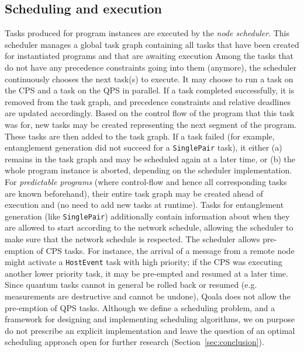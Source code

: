 \subsection{Scheduling and execution}
\label{sec:scheduling}
Tasks produced for program instances are executed by the \textit{node scheduler}.
This scheduler manages a global task graph containing all tasks that have been created for instantiated programs and that are awaiting execution
Among the tasks that do not have any precedence constraints going into them (anymore), the scheduler continuously chooses the next task(s) to execute.
It may choose to run a task on the CPS and a task on the QPS in parallel.
If a task completed successfully, it is removed from the task graph, and precedence constraints and relative deadlines are updated accordingly.
Based on the control flow of the program that this task was for, new tasks may be created representing the next segment of the program.
These tasks are then added to the task graph.
If a task failed (for example, entanglement generation did not succeed for a \texttt{SinglePair} task), it either (a) remains in the task graph and may be scheduled again at a later time,
or (b) the whole program instance is aborted, depending on the scheduler implementation.
For \textit{predictable programs} (where control-flow and hence all corresponding tasks are known beforehand), their entire task graph may be created ahead of execution
and (no need to add new tasks at runtime).
Tasks for entanglement generation (like \texttt{SinglePair}) additionally contain information about when they are allowed to start according to the network schedule,
allowing the scheduler to make sure that the network schedule is respected.
The scheduler allows pre-emption of CPS tasks.
For instance, the arrival of a message from a remote node might activate a \texttt{HostEvent} task with high priority;
if the CPS was executing another lower priority task, it may be pre-empted and resumed at a later time.
Since quantum tasks cannot in general be rolled back or resumed (e.g. measurements are destructive and cannot be undone), Qoala does not allow the pre-emption of QPS tasks.
Although we define a scheduling problem, and a framework for designing and implementing scheduling algorithms,
we on purpose do not prescribe an explicit implementation and leave the question of an optimal scheduling approach open for further research (Section~\ref{sec:conclusion}).
